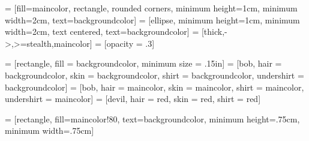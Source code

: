 \usetikzlibrary{backgrounds,fit,automata,positioning,shapes.geometric}


 = [fill=maincolor, rectangle, rounded corners, minimum height=1cm, minimum width=2cm, text=backgroundcolor]
 = [ellipse, minimum height=1cm, minimum width=2cm, text centered, text=backgroundcolor]
 = [thick,->,>=stealth,maincolor]
 = [opacity = .3]

 = [rectangle, fill = backgroundcolor, minimum size = .15in]
 = [bob, hair = backgroundcolor, skin = backgroundcolor, shirt = backgroundcolor, undershirt = backgroundcolor]
 = [bob, hair = maincolor, skin = maincolor, shirt = maincolor, undershirt = maincolor]
 = [devil, hair = red, skin = red, shirt = red]

 = [rectangle, fill=maincolor!80, text=backgroundcolor, minimum height=.75cm, minimum width=.75cm]

\newcommand{\thankyoupage}{
    \section*{}
    \begin{frame}
        \begin{center}
            \color{maincolor} \Huge \bf Thank You
        \end{center}
    \end{frame}
}
